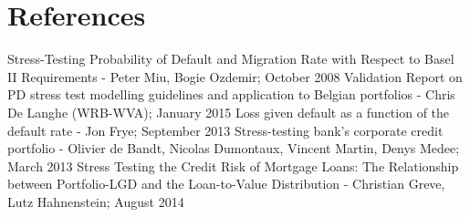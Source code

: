 \documentclass[a4paper]{article}
\begin{document}
\section{References}

\noindent [1] Stress-Testing Probability of Default and Migration Rate with Respect to Basel II Requirements - Peter Miu, Bogie Ozdemir; October 2008
\vskip 0.2in
\noindent [2] Validation Report on PD stress test modelling guidelines and application to Belgian portfolios - Chris De Langhe (WRB-WVA); January 2015
\vskip 0.2in
\noindent [3] Loss given default as a function of the default rate - Jon Frye; September 2013
\vskip 0.2in
\noindent [4] Stress-testing bank's corporate credit portfolio - Olivier de Bandt, Nicolas Dumontaux, Vincent Martin, Denys Medee; March 2013
\vskip 0.2in
\noindent [5] Stress Testing the Credit Risk of Mortgage Loans: The Relationship between Portfolio-LGD and the Loan-to-Value Distribution - Christian Greve, Lutz Hahnenstein; August 2014
\end{document}
